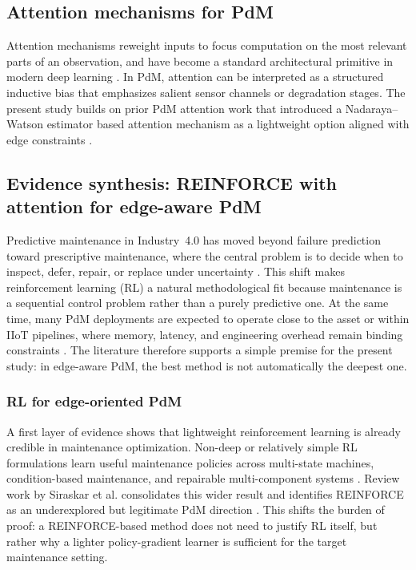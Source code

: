 \documentclass[sn-basic]{sn-jnl} %
\begin{document}
\subsection{Attention mechanisms for PdM}
Attention mechanisms reweight inputs to focus computation on the most relevant parts of an observation, and have become a standard architectural primitive in modern deep learning \cite{Vaswani2017}. In PdM, attention can be interpreted as a structured inductive bias that emphasizes salient sensor channels or degradation stages. The present study builds on prior PdM attention work that introduced a Nadaraya--Watson estimator based attention mechanism as a lightweight option aligned with edge constraints \cite{Siraskar2024}.

\subsection{Evidence synthesis: REINFORCE with attention for edge-aware PdM}
\label{sec:reinforce_attention_pdm}

Predictive maintenance in Industry~4.0 has moved beyond failure prediction toward prescriptive maintenance, where the central problem is to decide when to inspect, defer, repair, or replace under uncertainty \cite{Compare2020, Ansari2019, Siraskar2023, Zhang2024}. This shift makes reinforcement learning (RL) a natural methodological fit because maintenance is a sequential control problem rather than a purely predictive one. At the same time, many PdM deployments are expected to operate close to the asset or within IIoT pipelines, where memory, latency, and engineering overhead remain binding constraints \cite{Compare2020, Pandey2023, Njor2024}. The literature therefore supports a simple premise for the present study: in edge-aware PdM, the best method is not automatically the deepest one.

\subsubsection{RL for edge-oriented PdM}
A first layer of evidence shows that lightweight reinforcement learning is already credible in maintenance optimization. Non-deep or relatively simple RL formulations learn useful maintenance policies across multi-state machines, condition-based maintenance, and repairable multi-component systems \cite{Wang2014, Adsule2020, Yousefi2020}. Review work by Siraskar et al. consolidates this wider result and identifies REINFORCE as an underexplored but legitimate PdM direction \cite{Siraskar2023}. This shifts the burden of proof: a REINFORCE-based method does not need to justify RL itself, but rather why a lighter policy-gradient learner is sufficient for the target maintenance setting.
\end{document}
